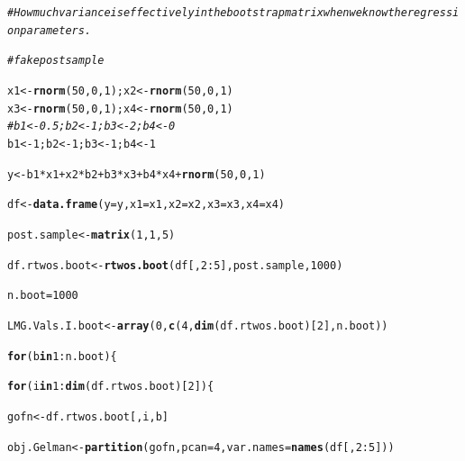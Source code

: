 \documentclass[11pt,a4paper,twoside]{book}\usepackage[]{graphicx}\usepackage[]{color}
\makeatletter
\newcommand{\hlnum}[1]{\textcolor[rgb]{0.686,0.059,0.569}{#1}}%
\newcommand{\hlcom}[1]{\textcolor[rgb]{0.678,0.584,0.686}{\textit{#1}}}%
\newcommand{\hlopt}[1]{\textcolor[rgb]{0,0,0}{#1}}%
\newcommand{\hlstd}[1]{\textcolor[rgb]{0.345,0.345,0.345}{#1}}%
\newcommand{\hlkwa}[1]{\textcolor[rgb]{0.161,0.373,0.58}{\textbf{#1}}}%
\newcommand{\hlkwb}[1]{\textcolor[rgb]{0.69,0.353,0.396}{#1}}%
\newcommand{\hlkwc}[1]{\textcolor[rgb]{0.333,0.667,0.333}{#1}}%
\newcommand{\hlkwd}[1]{\textcolor[rgb]{0.737,0.353,0.396}{\textbf{#1}}}%
\newenvironment{kframe}{%
 \def\at@end@of@kframe{}%
 \ifinner\ifhmode%
  \def\at@end@of@kframe{\end{minipage}}%
  \begin{minipage}{\columnwidth}%
 \fi\fi%
 \def\FrameCommand##1{\hskip\@totalleftmargin \hskip-\fboxsep
 \colorbox{shadecolor}{##1}\hskip-\fboxsep
     \hskip-\linewidth \hskip-\@totalleftmargin \hskip\columnwidth}%
 \MakeFramed {\advance\hsize-\width
   \@totalleftmargin\z@ \linewidth\hsize
   \@setminipage}}%
 {\par\unskip\endMakeFramed%
 \at@end@of@kframe}
\newenvironment{knitrout}{}{} %
\makeatother
\begin{document}
\begin{knitrout}
\color{fgcolor}\begin{kframe}
\begin{alltt}
\hlcom{#How much variance is effectively in the bootstrap matrix when we know the regression parameters.}

\hlcom{#fake post sample}

\hlstd{x1} \hlkwb{<-} \hlkwd{rnorm}\hlstd{(}\hlnum{50}\hlstd{,} \hlnum{0}\hlstd{,} \hlnum{1}\hlstd{); x2} \hlkwb{<-} \hlkwd{rnorm}\hlstd{(}\hlnum{50}\hlstd{,} \hlnum{0}\hlstd{,} \hlnum{1}\hlstd{)}
\hlstd{x3} \hlkwb{<-} \hlkwd{rnorm}\hlstd{(}\hlnum{50}\hlstd{,} \hlnum{0}\hlstd{,} \hlnum{1}\hlstd{); x4} \hlkwb{<-} \hlkwd{rnorm}\hlstd{(}\hlnum{50}\hlstd{,} \hlnum{0}\hlstd{,} \hlnum{1}\hlstd{)}
\hlcom{#b1 <- 0.5; b2 <- 1; b3 <- 2; b4 <- 0}
\hlstd{b1} \hlkwb{<-} \hlnum{1}\hlstd{; b2} \hlkwb{<-} \hlnum{1}\hlstd{; b3} \hlkwb{<-} \hlnum{1}\hlstd{; b4} \hlkwb{<-} \hlnum{1}

\hlstd{y} \hlkwb{<-} \hlstd{b1}\hlopt{*}\hlstd{x1} \hlopt{+} \hlstd{x2}\hlopt{*}\hlstd{b2} \hlopt{+} \hlstd{b3}\hlopt{*}\hlstd{x3} \hlopt{+} \hlstd{b4}\hlopt{*}\hlstd{x4} \hlopt{+} \hlkwd{rnorm}\hlstd{(}\hlnum{50}\hlstd{,} \hlnum{0}\hlstd{,} \hlnum{1}\hlstd{)}

\hlstd{df} \hlkwb{<-} \hlkwd{data.frame}\hlstd{(}\hlkwc{y} \hlstd{= y,} \hlkwc{x1} \hlstd{= x1,} \hlkwc{x2} \hlstd{= x2,} \hlkwc{x3} \hlstd{= x3,} \hlkwc{x4} \hlstd{= x4)}

\hlstd{post.sample} \hlkwb{<-} \hlkwd{matrix}\hlstd{(}\hlnum{1}\hlstd{,} \hlnum{1}\hlstd{,}\hlnum{5}\hlstd{)}

\hlstd{df.rtwos.boot} \hlkwb{<-}\hlkwd{rtwos.boot}\hlstd{(df[,}\hlnum{2}\hlopt{:}\hlnum{5}\hlstd{], post.sample,} \hlnum{1000}\hlstd{)}

\hlstd{n.boot} \hlkwb{=} \hlnum{1000}

\hlstd{LMG.Vals.I.boot}\hlkwb{<-}\hlkwd{array}\hlstd{(}\hlnum{0}\hlstd{,} \hlkwd{c}\hlstd{(}\hlnum{4}\hlstd{,}\hlkwd{dim}\hlstd{(df.rtwos.boot)[}\hlnum{2}\hlstd{], n.boot))}

\hlkwa{for} \hlstd{(b} \hlkwa{in} \hlnum{1}\hlopt{:}\hlstd{n.boot)\{}

\hlkwa{for}\hlstd{(i} \hlkwa{in} \hlnum{1}\hlopt{:}\hlkwd{dim}\hlstd{(df.rtwos.boot)[}\hlnum{2}\hlstd{])\{}

        \hlstd{gofn}\hlkwb{<-}\hlstd{df.rtwos.boot[,i,b]}

        \hlstd{obj.Gelman}\hlkwb{<-}\hlkwd{partition}\hlstd{(gofn,} \hlkwc{pcan} \hlstd{=} \hlnum{4}\hlstd{,} \hlkwc{var.names} \hlstd{=} \hlkwd{names}\hlstd{(df[,}\hlnum{2}\hlopt{:}\hlnum{5}\hlstd{]))}


\end{alltt}
\end{kframe}
\end{knitrout}
\end{document}
